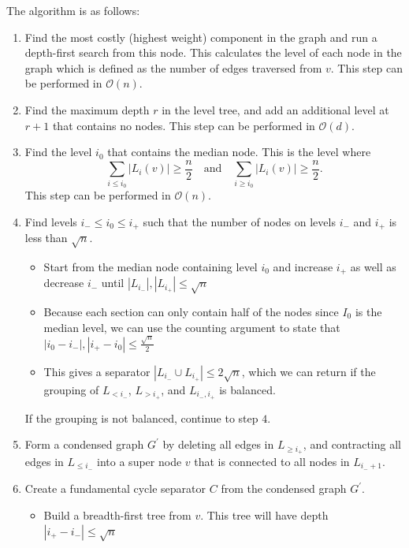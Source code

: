 \documentclass[11pt]{article}
\begin{document}
The algorithm is as follows:
\begin{enumerate}

    \item Find the most costly (highest weight) component in the graph and run a depth-first search from this node. This calculates the level of each node in the graph which is defined as the number of edges traversed from $v$. This step can be performed in $\mathcal{O}(n)$.

    \item Find the maximum depth $r$ in the level tree, and add an additional level at $r+1$ that contains no nodes. This step can be performed in $\mathcal{O}(d)$.

    \item Find the level $i_0$ that contains the median node. This is the level where
    \[
    \sum_{i \leq i_0} |L_i(v)| \geq \frac{n}{2} \quad \text{and}\quad \sum_{i \geq i_0} |L_i(v)| \geq \frac{n}{2}.
    \]
    This step can be performed in $\mathcal{O}(n)$.

    \item Find levels $i_- \leq i_0 \leq i_+$ such that the number of nodes on levels $i_-$ and $i_+$ is less than $\sqrt{n}$.
    \begin{itemize}
        \item Start from the median node containing level $i_0$ and increase $i_+$ as well as decrease $i_-$ until $|L_{i_-}|,|L_{i_+}| \leq \sqrt{n}$

        \item Because each section can only contain half of the nodes since $I_0$ is the median level, we can use the counting argument to state that $|i_0 - i_-|,|i_+ - i_0| \leq \frac{\sqrt{n}}{2}$

        \item This gives a separator $|L_{i_-} \cup L_{i_+}| \leq 2 \sqrt{n}$, which we can return if the grouping of $L_{< i_-}$, $L_{> i_+}$, and $L_{i_-,i_+}$ is balanced.
    \end{itemize}
    If the grouping is not balanced, continue to step $4$.

    \item Form a condensed graph $G^{'}$ by deleting  all edges in $L_{\geq i_+}$, and contracting all edges in $L_{\leq i_-}$ into a super node $v$ that is connected to all nodes in $L_{i_- + 1}$.

    \item Create a fundamental cycle separator $C$ from the condensed graph $G^{'}$.
    \begin{itemize}
        \item Build a breadth-first tree from $v$. This tree will have depth $|i_+ - i_-| \leq \sqrt{n}$


\end{itemize}
\end{enumerate}
\end{document}
